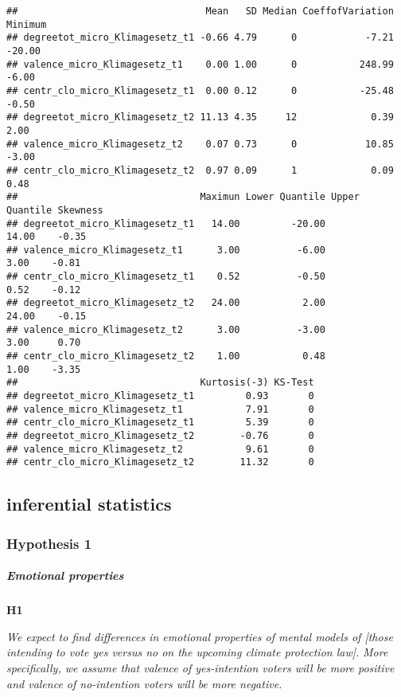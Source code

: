 \documentclass[
]{article}
\begin{document}
\begin{verbatim}
##                                 Mean   SD Median CoeffofVariation Minimum
## degreetot_micro_Klimagesetz_t1 -0.66 4.79      0            -7.21  -20.00
## valence_micro_Klimagesetz_t1    0.00 1.00      0           248.99   -6.00
## centr_clo_micro_Klimagesetz_t1  0.00 0.12      0           -25.48   -0.50
## degreetot_micro_Klimagesetz_t2 11.13 4.35     12             0.39    2.00
## valence_micro_Klimagesetz_t2    0.07 0.73      0            10.85   -3.00
## centr_clo_micro_Klimagesetz_t2  0.97 0.09      1             0.09    0.48
##                                Maximun Lower Quantile Upper Quantile Skewness
## degreetot_micro_Klimagesetz_t1   14.00         -20.00          14.00    -0.35
## valence_micro_Klimagesetz_t1      3.00          -6.00           3.00    -0.81
## centr_clo_micro_Klimagesetz_t1    0.52          -0.50           0.52    -0.12
## degreetot_micro_Klimagesetz_t2   24.00           2.00          24.00    -0.15
## valence_micro_Klimagesetz_t2      3.00          -3.00           3.00     0.70
## centr_clo_micro_Klimagesetz_t2    1.00           0.48           1.00    -3.35
##                                Kurtosis(-3) KS-Test
## degreetot_micro_Klimagesetz_t1         0.93       0
## valence_micro_Klimagesetz_t1           7.91       0
## centr_clo_micro_Klimagesetz_t1         5.39       0
## degreetot_micro_Klimagesetz_t2        -0.76       0
## valence_micro_Klimagesetz_t2           9.61       0
## centr_clo_micro_Klimagesetz_t2        11.32       0
\end{verbatim}

\hypertarget{inferential-statistics}{%
\subsection{inferential statistics}\label{inferential-statistics}}

\hypertarget{hypothesis-1}{%
\subsubsection{Hypothesis 1}\label{hypothesis-1}}

\hypertarget{emotional-properties}{%
\subparagraph{Emotional properties}\label{emotional-properties}}

\textbf{H1}

\emph{We expect to find differences in emotional properties of mental
models of {[}those intending to vote yes versus no on the upcoming
climate protection law{]}.} \emph{More specifically, we assume that
valence of yes-intention voters will be more positive and valence of
no-intention voters will be more negative.}
\end{document}

